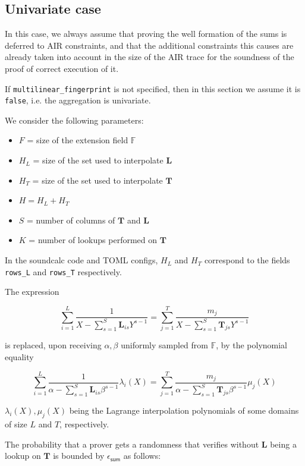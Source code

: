 \subsection{Univariate case}

In this case, we always assume that proving the well formation of the sums is deferred to AIR constraints, and that the additional constraints this causes are already taken into account in the size of the AIR trace for the soundness of the proof of correct execution of it.

If \texttt{multilinear\_fingerprint} is not specified, then in this section we assume it is \texttt{false}, i.e. the aggregation is univariate.

We consider the following parameters:
\begin{itemize}
	\item $F$ = size of the extension field $\mathbb{F}$
	\item $H_L$ = size of the set used to interpolate $\mathbf{L}$
	\item $H_T$ = size of the set used to interpolate $\mathbf{T}$
	\item $H = H_L + H_T$
	\item $S$ = number of columns of $\mathbf{T}$ and $\mathbf{L}$
	\item $K$ = number of lookups performed on $\mathbf{T}$
\end{itemize}

In the soundcalc code and TOML configs, $H_L$ and $H_T$ correspond to the fields \texttt{rows\_L} and \texttt{rows\_T} respectively.

The expression

$$\sum_{i=1}^L \frac{1}{X- \sum_{s=1}^S \mathbf L_{is}Y^{s-1}}=\sum_{j=1}^T \frac{m_j}{X-\sum_{s=1}^S \mathbf T_{js}Y^{s-1}}$$

is replaced, upon receiving $\alpha, \beta$ uniformly sampled from $\mathbb{F}$, by the polynomial equality  

$$\sum_{i=1}^L \frac{1}{\alpha- \sum_{s=1}^S \mathbf L_{is}\beta^{s-1}}\lambda_i(X)=\sum_{j=1}^T \frac{m_j}{\alpha-\sum_{s=1}^S \mathbf T_{js}\beta^{s-1}}\mu_j(X)$$

$\lambda_i(X), \mu_j(X)$ being the Lagrange interpolation polynomials of some domains of size $L$ and $T$, respectively.


The probability that a prover gets a randomness that verifies without $\mathbf L$ being a lookup on $\mathbf{T}$ is bounded by $\epsilon_{\mathsf{sum}}$ as follows:


